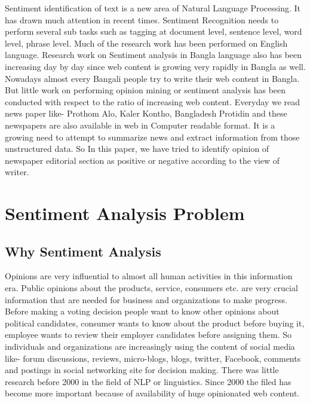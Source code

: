 \documentclass[a4paper,12pt]{report}
\begin{document}
Sentiment identification of text is a new area of Natural Language Processing. It has drawn much attention in recent times. Sentiment Recognition needs to perform several sub tasks such as tagging at document level, sentence level, word level, phrase level. Much of the research work has been performed on English language. Research work on Sentiment analysis in Bangla language also has been increasing day by day since web content is growing very rapidly in Bangla as well. Nowadays almost every Bangali people try to write their web content in Bangla. But little work on performing opinion mining or sentiment analysis has been conducted with respect to the ratio of increasing web content. Everyday we read news paper like- Prothom Alo, Kaler Kontho, Bangladesh Protidin and these newspapers are also available in web in Computer readable format. It is a growing need to attempt to summarize news and extract information from those unstructured data. \citep {das2010opinion} So In this paper, we have tried to identify opinion of newspaper editorial section as positive or negative according to the view of writer. 



\setcounter{page}{1}


\chapter{Sentiment Analysis Problem}
\section{Why Sentiment Analysis}
Opinions are very influential to almost all human activities in this information era. Public opinions about the products, service, consumers etc. are very crucial information that are needed for business and organizations to make progress. Before making a voting decision people want to know other opinions about political candidates, consumer wants to know about the product before buying it, employee wants to  review their employer candidates before assigning them. So individuals and organizations are increasingly using the content of social media like- forum discussions, reviews, micro-blogs, blogs, twitter, Facebook, comments and postings in social networking site for decision making. There was little research before 2000 in the field of NLP or linguistics. Since 2000 the filed has become more important because of availability of huge opinionated web content. \citep{liu2012sentiment}
\end{document}

